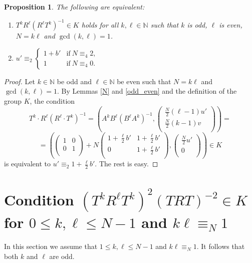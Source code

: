 \documentclass[10pt]{amsart}
\theoremstyle{plain}
\newtheorem{proposition}[theorem]{Proposition}
\theoremstyle{definition}
\theoremstyle{remark}%
\newcommand{\N}{\mathbb{N}}
\newcommand{\mat}[4]{\left(\begin{array}{cc}
 #1 & #2\\
 #3 & #4\\
\end{array}\right)}
\newcommand{\vc}[2]{\left(\begin{array}{c}
 #1 \\
 #2\\
\end{array}\right)}
\begin{document}
\begin{proposition}\label{3.5}
The following are equivalent:
\begin{enumerate}
\item[(i)] $T^{k}R^{\ell}(R^{\ell}T^{k})^{-1}\in K$  holds for all $k,\ell\in \N$ such that $k$ is odd, $\ell$ is even, $N=k\ell$ and $\gcd(k,\ell)=1$. 
\item[(ii)]  $u'\equiv_2\begin{cases} 1+b' & \text{if}\ N\equiv_4 2,\\ 1 & \text{if}\ N\equiv_4 0  .\end{cases}$
\end{enumerate}
\end{proposition}
\begin{proof}
Let $k\in\N$ be odd and $\ell\in\N$ be even such that $N=k\ell$ and $\gcd(k,\ell)=1$. 
By Lemmas \ref{N} and \ref{odd_even} and the definition of the group $K$, the condition
$$T^k\cdot R^\ell\left(R^\ell\cdot T^k\right)^{-1}=\left(A^kB^\ell(B^\ell A^k)^{-1},\vc{\frac{N}{2}(\ell-1)u'}{\frac{N}{2}(k-1)v}\right)=$$
$$=\left(\mat{1}{0}{0}{1}+N\mat{1+\frac{\ell}{2}b'}{1+\frac{\ell}{2}b'}{0}{1+\frac{\ell}{2}b'},\vc{\frac{N}{2}u'}{0}\right)\in K$$
is equivalent to 
$u'\equiv_2 1+\frac{\ell}{2}b'$. The rest is easy.
\end{proof}












\section{Condition $(T^k R^{\ell}T^k)^2(TRT)^{-2}\in K$ for $0\leq k,\ell\leq N-1$ and $k\ell\equiv_N 1$}\label{section_10}







In this section we assume that $1\leq k,\ell\leq N-1$ and $k\ell\equiv_N 1$. It follows that both $k$ and $\ell$ are odd.
\end{document}
